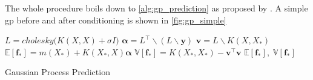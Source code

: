 The whole procedure boils down to \cref{alg:gp_prediction} as proposed by \cite{rasmussen}. A simple \acrshort{gp} before and after conditioning is shown in \cref{fig:gp_simple}

\begin{algorithm}[H]
\begin{algorithmic}[1]
    \State $L = cholesky\big(K(X, X) + \sigma I\big)$
    \State $\boldsymbol{\alpha} = L^\intercal \backslash (L \backslash \boldsymbol{y})$
    \State $\boldsymbol{v} = L \backslash K(X, X_*)$
    \State $\mathbb{E}[\boldsymbol{f}_*] = m(X_*) + K(X_*, X) \boldsymbol{\alpha}$
    \State $\mathbb{V}[\boldsymbol{f}_*] = K(X_*, X_*) - \boldsymbol{v}^\intercal \boldsymbol{v}$
    \State \Return $\mathbb{E}[\boldsymbol{f}_*], \; \mathbb{V}[\boldsymbol{f}_*]$
\EndProcedure
\end{algorithmic}
\caption{Gaussian Process Prediction}
\label{alg:gp_prediction}
\end{algorithm}

